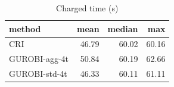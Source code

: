 \begin{table}[htbp]
\centering
\small
\caption{Charged time (s)}
\label{tab:E7_gurobi_threads_b60_time}
\begin{tabular}{lrrr}
\toprule
method & mean & median & max \\
\midrule
CRI & 46.79 & 60.02 & 60.16 \\
GUROBI-agg-4t & 50.84 & 60.19 & 62.66 \\
GUROBI-std-4t & 46.33 & 60.11 & 61.11 \\
\bottomrule
\end{tabular}
\end{table}
